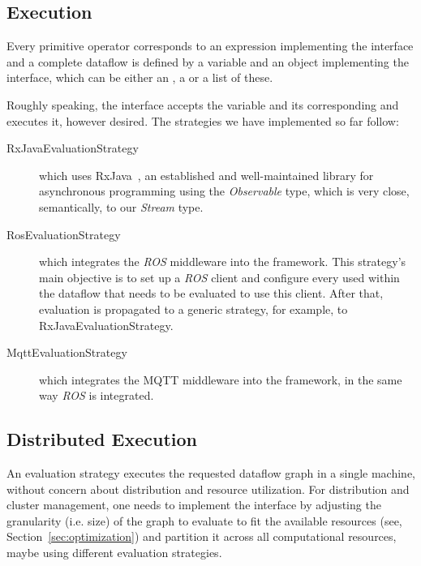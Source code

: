 \documentclass[sigplan,screen,10pt]{acmart}
\begin{document}
\subsection{Execution}

Every primitive operator corresponds to an expression implementing the
 interface and a complete dataflow is defined by a
 variable and an object implementing the  interface,
which can be either an , a  or a list of these.

Roughly speaking, the  interface accepts the
 variable and its corresponding  and executes it,
however desired. The strategies we have implemented so far follow:
\begin{description}
\item[RxJavaEvaluationStrategy]
which uses RxJava~, an established and well-maintained library for
asynchronous programming using the \textit{Observable} type, which is very close,
semantically, to our \textit{Stream} type.

\item[RosEvaluationStrategy] which integrates the \textit{ROS} middleware into the
framework. This strategy's main objective is to set up a \textit{ROS} client and
configure every  used within the dataflow that needs to be
evaluated to use this client. After that, evaluation is propagated to a generic
strategy, for example, to RxJavaEvaluationStrategy.

\item[MqttEvaluationStrategy] which integrates the MQTT middleware into the
framework, in the same way \textit{ROS} is integrated.

\end{description}

\subsection{Distributed Execution} \label{sec:distributed}

An evaluation strategy executes the requested dataflow graph in a single
machine, without concern about distribution and resource utilization.
%
For distribution and cluster management, one needs to implement
the  interface by adjusting the granularity (i.e. size) of
the graph to evaluate to fit the available resources (see, Section~\ref{sec:optimization})
and partition it across all computational resources, maybe using different evaluation strategies.
\end{document}
